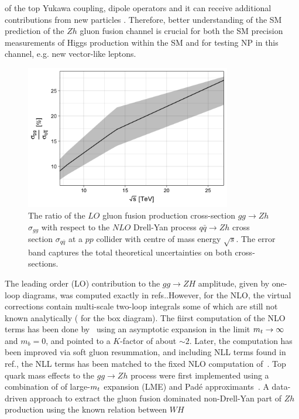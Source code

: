 of the top Yukawa coupling,  dipole operators \cite{Englert:2016hvy}
and it can receive additional contributions from new particles \cite{Harlander:2013mla}. Therefore, better understanding of the SM prediction of the $Zh$ gluon fusion channel is crucial for both the SM precision measurements of Higgs production within the SM and for testing NP in this channel, e.g. new vector-like leptons.  
\begin{figure}
	\begin{center}
		\includegraphics[width=9cm]{./figures/Rplot}
		\caption{The ratio of the $LO$ gluon fusion production cross-section $ gg \to Zh$  $\sigma_{gg}$ with respect to the $NLO$ Drell-Yan process $ q\bar{q} \to Zh$ cross section $\sigma_{q\bar{q}}$ at a $pp$ collider with centre of mass energy $\sqrt{s}$. The error band captures the total theoretical uncertainties on both cross-sections.}
		\label{fig:hzratio}
	\end{center}
\end{figure}
\par  The leading order (LO) contribution to the $g g \rightarrow Z H$ amplitude, given by one-loop diagrams, was computed exactly in refs.\cite{Kniehl:1990iva, Dicus:1988yh}.However, for the NLO, the virtual corrections contain multi-scale two-loop integrals some of which are still not known analytically ( for the box diagram).  The fiirst computation of the NLO terms has been done by~\cite{Altenkamp:2012sx} using an asymptotic expansion in the limit
$m_t \rightarrow \infty$ and $m_b = 0$, and pointed to a $K$-factor of about $\sim2$.  Later, the computation has been improved via soft gluon resummation, and including NLL terms found in ref.\cite{Harlander:2014wda}, the NLL terms has been matched to the fixed NLO computation of~\cite{Altenkamp:2012sx}.  Top quark mass effects to the  $g g \rightarrow Zh$ process were first implemented using a combination of of large-$m_t$ expansion (LME) and Pad\'e approximants~\cite{Hasselhuhn:2016rqt}. A data-driven approach to extract the gluon fusion dominated non-Drell-Yan part of $Zh$ production using the known relation between  $W H$
